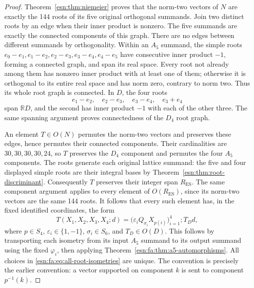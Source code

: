 \begin{proof}
Theorem~\ref{esn:thm:niemeier} proves that the norm-two vectors of \(N\)
are exactly the 144 roots of its five original orthogonal summands.
Join two distinct roots by an edge when their inner product is nonzero.
The five summands are exactly the connected components of this graph.
There are no edges between different summands by orthogonality.
Within an \(A_5\) summand, the simple roots
\(e_0-e_1,e_1-e_2,e_2-e_3,e_3-e_4,e_4-e_5\)
have consecutive inner product \(-1\), forming a connected graph,
and span its real space.  Every root not already among them has nonzero
inner product with at least one of them; otherwise it is orthogonal
to its entire real space and has norm zero, contrary to norm two.
Thus its whole root graph is connected.  In \(D\), the four roots
\[
 e_1-e_2,\quad e_2-e_3,\quad e_3-e_4,\quad e_3+e_4
\]
span \(\mathbb R D\), and the second has inner product \(-1\)
with each of the other three.  The same spanning argument proves
connectedness of the \(D_4\) root graph.

An element \(T\in O(N)\) permutes the norm-two vectors and preserves
these edges, hence permutes their connected components.  Their
cardinalities are \(30,30,30,30,24\), so \(T\) preserves the
\(D_4\) component and permutes the four \(A_5\) components.
The roots generate each original lattice summand: the five and four
displayed simple roots are their integral bases by
Theorem~\ref{esn:thm:root-discriminant}.
Consequently \(T\) preserves their integer span
\(R_{\mathrm{ES}}\).  The same component argument applies to every
element of \(O(R_{\mathrm{ES}})\), since its norm-two vectors are
the same 144 roots.  It follows that every such element has, in the
fixed identified coordinates, the form
\begin{equation}
 T(X_1,X_2,X_3,X_4;d)
    =\bigl(\varepsilon_iQ_{\sigma_i}X_{p(i)}\bigr)_{i=1}^4
                                  \mathbin{;}T_Dd,
 \label{esn:fa:eq:all-root-isometries}
\end{equation}
where \(p\in S_4\), \(\varepsilon_i\in\{1,-1\}\),
\(\sigma_i\in S_6\), and \(T_D\in O(D)\).
This follows by transporting each isometry from its input \(A_5\)
summand to its output summand using the fixed \(\varphi_i\), then
applying Theorem~\ref{esn:fa:thm:a5-automorphisms}.
All choices in \eqref{esn:fa:eq:all-root-isometries} are unique.
The convention is precisely the earlier convention: a vector supported
on component \(k\) is sent to component \(p^{-1}(k)\).


\end{proof}
